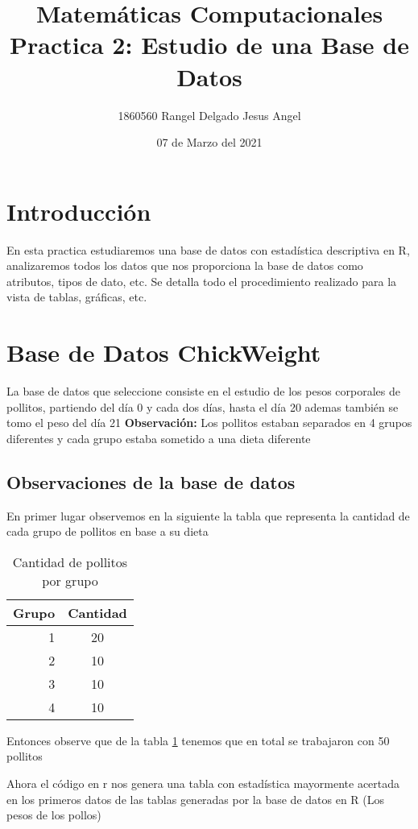 \documentclass{article}
\title{Matemáticas Computacionales \\ Practica 2: Estudio de una Base de Datos}
\author{1860560 Rangel Delgado Jesus Angel}
\date{07 de Marzo del 2021}
\begin{document}
\maketitle

\section{Introducción}
En esta practica estudiaremos una base de datos con estadística descriptiva en R, analizaremos todos los datos que nos proporciona la base de datos como atributos, tipos de dato, etc.
Se detalla todo el procedimiento realizado para la vista de tablas, gráficas, etc.

\section{Base de Datos ChickWeight}
La base de datos que seleccione consiste en el estudio de los pesos corporales de pollitos, partiendo del día 0 y cada dos días, hasta el día 20 ademas también se tomo el peso del día 21
\textbf{Observación:} Los pollitos estaban separados en 4 grupos diferentes y cada grupo estaba sometido a una dieta diferente

\subsection{Observaciones de la base de datos}
En primer lugar observemos en la siguiente la tabla que representa la cantidad de cada grupo de pollitos en base a su dieta
\newpage
\begin{table}[h]
\begin{center}
\begin{tabular}{| r  | c |}
Grupo & Cantidad  \\ \hline
1 & 20  \\
2 & 10 \\
3 & 10 \\
4 & 10 \\ \hline
\end{tabular}
\caption{Cantidad de pollitos por grupo}
\label{tab:pollito}
\end{center}
\end{table}

Entonces observe que de la tabla \ref{tab:pollito} tenemos que en total se trabajaron con 50 pollitos

Ahora el código en r nos genera una tabla con estadística mayormente acertada en los primeros datos de las tablas generadas por la base de datos en R (Los pesos de los pollos)
\end{document}
